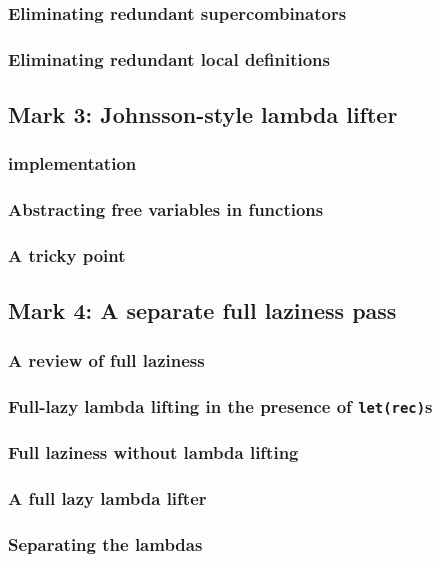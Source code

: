 \documentclass{jarticle}
\begin{document}
\subsubsection{Eliminating redundant supercombinators}
\subsubsection{Eliminating redundant local definitions}
\newpage

\subsection{Mark 3: Johnsson-style lambda lifter}
\subsubsection{implementation}
\subsubsection{Abstracting free variables in functions}
\subsubsection{A tricky point \dag}
\newpage

\subsection{Mark 4: A separate full laziness pass}
\subsubsection{A review of full laziness}
\subsubsection{Full-lazy lambda lifting in the presence of \texttt{let(rec)}s}
\subsubsection{Full laziness without lambda lifting}
\subsubsection{A full lazy lambda lifter}
\subsubsection{Separating the lambdas}
\end{document}
